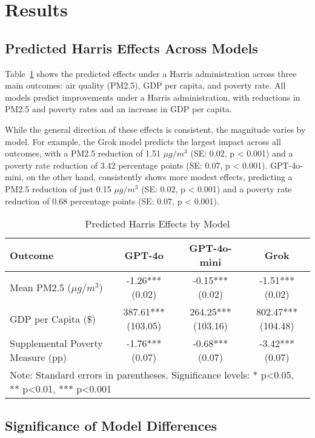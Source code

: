 \section{Results}\label{sec:results}

\subsection{Predicted Harris Effects Across Models}

Table~\ref{tab:harris_effects} shows the predicted effects under a Harris administration across three main outcomes: air quality (PM2.5), GDP per capita, and poverty rate. All models predict improvements under a Harris administration, with reductions in PM2.5 and poverty rates and an increase in GDP per capita.

While the general direction of these effects is consistent, the magnitude varies by model. For example, the Grok model predicts the largest impact across all outcomes, with a PM2.5 reduction of 1.51 $\mu g/m^3$ (SE: 0.02, p < 0.001) and a poverty rate reduction of 3.42 percentage points (SE: 0.07, p < 0.001). GPT-4o-mini, on the other hand, consistently shows more modest effects, predicting a PM2.5 reduction of just 0.15 $\mu g/m^3$ (SE: 0.02, p < 0.001) and a poverty rate reduction of 0.68 percentage points (SE: 0.07, p < 0.001).

\begin{table}[htbp]
    \centering
    \caption{Predicted Harris Effects by Model}
    \begin{tabular}{lccc}
    \hline
    Outcome & GPT-4o & GPT-4o-mini & Grok \\
    \hline
    Mean PM2.5 ($\mu g/m^3$) & -1.26*** (0.02) & -0.15*** (0.02) & -1.51*** (0.02) \\
    GDP per Capita (\$) & 387.61*** (103.05) & 264.25*** (103.16) & 802.47*** (104.48) \\
    Supplemental Poverty Measure (pp) & -1.76*** (0.07) & -0.68*** (0.07) & -3.42*** (0.07) \\
    \hline
    \multicolumn{4}{p{0.8\textwidth}}{\small Note: Standard errors in parentheses. Significance levels: * p<0.05, ** p<0.01, *** p<0.001} \\
    \end{tabular}
    \label{tab:harris_effects}
\end{table}

\subsection{Significance of Model Differences}

